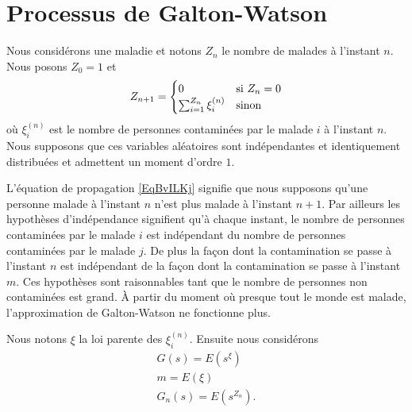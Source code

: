 \section{Processus de Galton-Watson}
\label{SecBPmrPdtGalton}

Nous considérons une maladie et notons \( Z_n\) le nombre de malades à l'instant \( n\). Nous posons \( Z_0=1\) et
\begin{equation}        \label{EqBvILKj}
    Z_{n+1}=\begin{cases}
        0    &   \text{si \( Z_n=0\)}\\
        \sum_{i=1}^{Z_n}\xi_i^{(n)}    &    \text{sinon}
    \end{cases}
\end{equation}
où \( \xi_i^{(n)}\) est le nombre de personnes contaminées par le malade \(i\) à l'instant \( n\). Nous supposons que ces variables aléatoires sont indépendantes et identiquement distribuées et admettent un moment d'ordre \( 1\).

L'équation de propagation \ref{EqBvILKj} signifie que nous supposons qu'une personne malade à l'instant \( n\) n'est plus malade à l'instant \( n+1\). Par ailleurs les hypothèses d'indépendance signifient qu'à chaque instant, le nombre de personnes contaminées par le malade \( i\) est indépendant du nombre de personnes contaminées par le malade \( j\). De plus la façon dont la contamination se passe à l'instant \( n\) est indépendant de la façon dont la contamination se passe à l'instant \( m\). Ces hypothèses sont raisonnables tant que le nombre de personnes non contaminées est grand. À partir du moment où presque tout le monde est malade, l'approximation de Galton-Watson ne fonctionne plus.

Nous notons \( \xi\) la loi parente des \( \xi_i^{(n)}\). Ensuite nous considérons 
\begin{subequations}
    \begin{align}
        G(s)=E(s^{\xi})\\
        m=E(\xi)\\
        G_n(s)=E(s^{Z_n}).
    \end{align}
\end{subequations}

